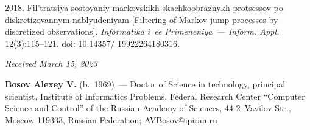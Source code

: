 \begin{multicols}{2}
{{\begin{thebibliography}{99}
        2018. Fil't\-ra\-tsiya so\-sto\-yaniy \mbox{mar\-kov\-skikh} skach\-ko\-ob\-raz\-nykh pro\-tses\-sov 
po dis\-kre\-ti\-zo\-van\-nym nab\-lyu\-de\-niyam [Filtering of Markov jump processes by discretized observations]. 
\textit{Informatika i~ee Primeneniya~--- Inform. Appl.} 12(3):115--121. doi: 10.14357/ 19922264180316.

\end{thebibliography}

 }
 }

\end{multicols}

\vspace*{-6pt}

\hfill{\small\textit{Received March 15, 2023}} 
      
      \Contrl
      
      \noindent
      \textbf{Bosov Alexey V.} (b.\ 1969)~--- Doctor of Science in technology, principal scientist, 
Institute of Informatics Problems, Federal Research Center ``Computer Science and Control'' of the 
Russian Academy of Sciences, 44-2~Vavilov Str., Moscow 119333, Russian Federation; 
\mbox{AVBosov@ipiran.ru}



   
\label{end\stat}

\renewcommand{\bibname}{\protect\rm Литература} 
      